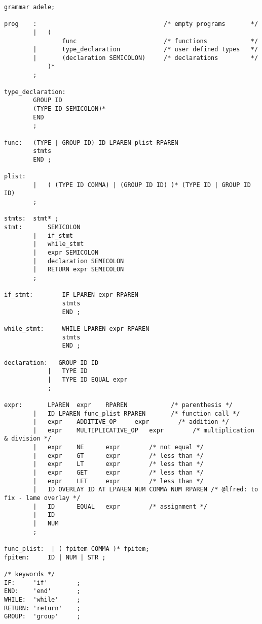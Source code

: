\documentclass[11pt,letterpaper]{article}
\begin{document}
\begin{lstlisting}[tabsize=4]
grammar adele;

prog    :                                   /* empty programs       */ 
        |   ( 
                func                        /* functions            */
        |       type_declaration            /* user defined types   */
        |       (declaration SEMICOLON)     /* declarations         */
            )*              
        ;
        
type_declaration:
        GROUP ID 
        (TYPE ID SEMICOLON)* 
        END
        ;

func:   (TYPE | GROUP ID) ID LPAREN plist RPAREN 
        stmts
        END ;

plist:  
        |   ( (TYPE ID COMMA) | (GROUP ID ID) )* (TYPE ID | GROUP ID ID) 
        ;

stmts:  stmt* ;
stmt:       SEMICOLON       
        |   if_stmt       
        |   while_stmt      
        |   expr SEMICOLON  
        |   declaration SEMICOLON
        |   RETURN expr SEMICOLON
        ;

if_stmt:        IF LPAREN expr RPAREN 
                stmts 
                END ;

while_stmt:     WHILE LPAREN expr RPAREN 
                stmts 
                END ;

declaration:   GROUP ID ID
            |   TYPE ID 
            |   TYPE ID EQUAL expr
            ;

expr:       LPAREN  expr    RPAREN            /* parenthesis */
        |   ID LPAREN func_plist RPAREN       /* function call */
        |   expr    ADDITIVE_OP     expr        /* addition */
        |   expr    MULTIPLICATIVE_OP   expr        /* multiplication & division */
        |   expr    NE      expr        /* not equal */
        |   expr    GT      expr        /* less than */
        |   expr    LT      expr        /* less than */
        |   expr    GET     expr        /* less than */
        |   expr    LET     expr        /* less than */
        |   ID OVERLAY ID AT LPAREN NUM COMMA NUM RPAREN /* @lfred: to fix - lame overlay */
        |   ID      EQUAL   expr        /* assignment */
        |   ID  
        |   NUM
        ; 

func_plist:  | ( fpitem COMMA )* fpitem;
fpitem:     ID | NUM | STR ;

/* keywords */
IF:     'if'        ;
END:    'end'       ;
WHILE:  'while'     ;
RETURN: 'return'    ;
GROUP:  'group'     ;


\end{lstlisting}
\end{document}
